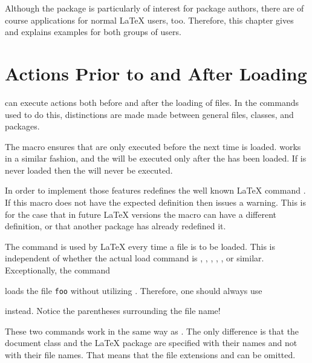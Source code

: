Although the package is particularly of interest for package authors, there
are of course applications for normal {\LaTeX} users, too.  Therefore, this
chapter gives and explains examples for both groups of users.


\section{Actions Prior to and After Loading}

 can execute actions both before and after the
loading of files. In the commands used to do this, distinctions are
made made between general files, classes, and packages.

\begin{Declaration}
\end{Declaration}%
The macro  ensures that  are
only executed before the next time  is loaded.
 works in a similar fashion, and the
 will be executed only after the  has
been loaded.  If  is never loaded then the
 will never be executed.

In order to implement those features  redefines the well
known {\LaTeX} command . If this macro does not have
the expected definition then  issues a warning.  This is for
the case that in future {\LaTeX} versions the macro can have a different
definition, or that another package has already redefined it.
  
The command  is used by {\LaTeX} every time a file is
to be loaded.  This is independent of whether the actual load command is
, , , ,
, or similar. Exceptionally, the command
\begin{lstcode}
  
\end{lstcode}
loads the file \texttt{foo} without utilizing
. Therefore, one should always use
\begin{lstcode}
  
\end{lstcode}
instead. Notice the parentheses surrounding the file name!%
%
\EndIndexGroup


\begin{Declaration}
\end{Declaration}%
These two commands work in the same way as .  The only
difference is that the document class  and the {\LaTeX} package
 are specified with their names and not with their file names.
That means that the file extensions  and  can be
omitted.%
%
\EndIndexGroup


